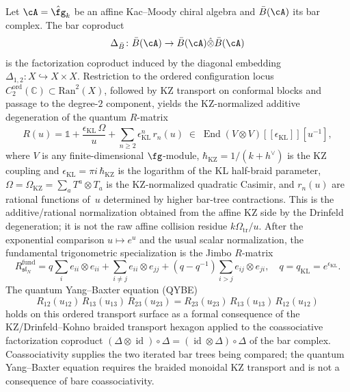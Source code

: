 \begin{proposition}
\label{prop:rmatrix-from-bar-coproduct}
Let $\cA = \hat\fg_k$ be an affine Kac--Moody chiral algebra and
$\bar B(\cA)$ its bar complex. The bar coproduct
\[
\Delta_{\bar B}\colon \bar B(\cA) \to
\bar B(\cA) \hat\otimes \bar B(\cA)
\]
is the factorization coproduct induced by the diagonal embedding
$\Delta_{1,2}\colon X \hookrightarrow X \times X$. Restriction to the
ordered configuration locus $C_2^{\mathrm{ord}}(\mathbb{C}) \subset
\mathrm{Ran}^2(X)$, followed by KZ transport on conformal blocks and
passage to the degree-$2$ component, yields the KZ-normalized additive
degeneration of the quantum $R$-matrix
\begin{equation}\label{eq:quantum-R-from-bar-coproduct}
R(u) = \mathbb{1} + \frac{\epsilon_{\mathrm{KL}}\, \Omega}{u}
+ \sum_{n \ge 2} \epsilon_{\mathrm{KL}}^n\, r_n(u)
\;\in\;
\operatorname{End}(V \otimes V)[\![{\epsilon_{\mathrm{KL}}}]\!][u^{-1}],
\end{equation}
where $V$ is any finite-dimensional $\fg$-module,
$\hbar_{\mathrm{KZ}} = 1/(k+h^\vee)$ is the KZ coupling and
$\epsilon_{\mathrm{KL}}=\pi i\,\hbar_{\mathrm{KZ}}$ is the logarithm
of the KL half-braid parameter,
$\Omega=\Omega_{\mathrm{KZ}}=\sum_a T^a \otimes T_a$ is the
KZ-normalized quadratic Casimir,
and $r_n(u)$ are rational functions of~$u$ determined by higher
bar-tree contractions. This is the additive/rational normalization
obtained from the affine KZ side by the Drinfeld degeneration; it is
not the raw affine collision residue $k\Omega_{\mathrm{tr}}/u$.
After the exponential comparison $u\mapsto e^u$ and the usual scalar
normalization, the fundamental trigonometric specialization is the
Jimbo $R$-matrix~\cite{Jimbo85}
\begin{equation}\label{eq:jimbo-R-matrix}
R^{\mathrm{fund}}_{\mathfrak{sl}_N}
= q \sum_i e_{ii} \otimes e_{ii}
+ \sum_{i \neq j} e_{ii} \otimes e_{jj}
+ (q - q^{-1}) \sum_{i > j} e_{ij} \otimes e_{ji},
\quad q=q_{\mathrm{KL}}=e^{\epsilon_{\mathrm{KL}}}.
\end{equation}
The quantum Yang--Baxter equation \textup{(}QYBE\textup{)}
\begin{equation}\label{eq:qybe-from-bar}
R_{12}(u_{12})\, R_{13}(u_{13})\, R_{23}(u_{23})
= R_{23}(u_{23})\, R_{13}(u_{13})\, R_{12}(u_{12})
\end{equation}
holds on this ordered transport surface as a formal consequence of the
KZ/Drinfeld--Kohno braided transport hexagon applied to the
coassociative factorization coproduct
$(\Delta \otimes \operatorname{id}) \circ \Delta
= (\operatorname{id} \otimes \Delta) \circ \Delta$
of the bar complex. Coassociativity supplies the two iterated bar
trees being compared; the quantum Yang--Baxter equation requires the
braided monoidal KZ transport and is not a consequence of bare
coassociativity.
\end{proposition}

